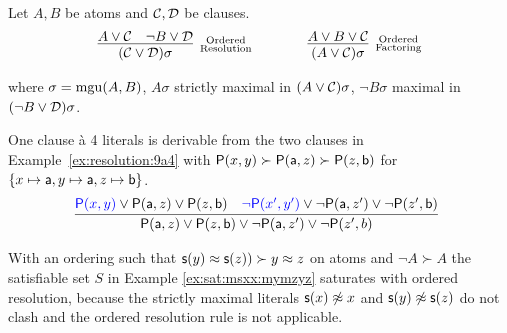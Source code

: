 \begin{definition}\label{def:ordered:resolution}
	Let \( A, B \) be atoms and \( \mathcal{C},\mathcal{D} \) be clauses.
	\begin{gather*}
	\infer
	[\substack{\text{Ordered}\\\text{Resolution}}]
	{(\mcC\lor\mcD)\sigma}
	{A\lor\mcC&\lnot B\lor\mcD}
	\qquad\qquad
	\infer
	[\substack{\text{Ordered}\\\text{Factoring}}]
	{(A\lor\mcC)\sigma}
	{A\lor B\lor\mcC}
	\end{gather*}
	\begin{center}
		where \( \sigma=\operatorname{mgu}(A,B) \),
		\( A\sigma \) strictly maximal in \( (A\lor\mathcal{C})\sigma \),
		\( \lnot B\sigma \) maximal in \( (\lnot B\lor\mathcal{D})\sigma \).
	\end{center}
\end{definition}

\begin{example}\label{ex:resolution:1a4}
	One clause à 4 literals is derivable from the two clauses
	in Example~\vref{ex:resolution:9a4} with
	\( \mathsf{P}(x,y)\succ\mathsf{P}(\mathsf{a},z)\succ\mathsf{P}(z,\mathsf{b}) \)
	for \( \{ x\mapsto\mathsf{a}, y\mapsto\mathsf{a},z\mapsto\mathsf{b} \} \).
	\begin{gather*}
	\infer[]{\mP(\ma,z)\lor\mP(z,\mb)\lor\lnot\mP(\ma,z')\lor\lnot\mP(z',b)}
	{{\colN\mP(x,y)}\lor\mP(\ma,z)\lor\mP(z,\mb) & {\colN\lnot\mP(x',y')}\lor\lnot\mP(\ma,z')\lor\lnot\mP(z',\mb)}
	\end{gather*}

\end{example}

\begin{example}
	With an ordering such that \( \mathsf{s}(y)\approx\mathsf{s}(z)) \succ y\approx z \) on atoms and \( {\lnot A} \succ A \)
	the satisfiable set \( S \) in Example \vref{ex:sat:msxx:mymzyz} saturates with ordered resolution,
	because the strictly maximal literals
	\( \mathsf{s}(x)\not\approx x \) and
	\( \mathsf{s}(y)\not\approx\mathsf{s}(z) \)
	do not clash and the ordered resolution rule is not applicable.
\end{example}


